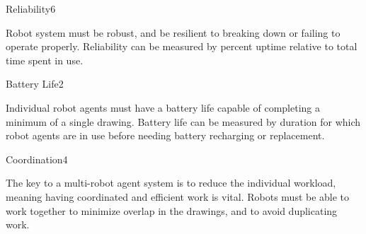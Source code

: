 \begin{nonfunctional_requirement}{Reliability}{6}
\item Robot system must be robust, and be resilient to breaking down or failing to operate properly. Reliability can be measured by percent uptime relative to total time spent in use.
\end{nonfunctional_requirement}

\begin{nonfunctional_requirement}{Battery Life}{2}
\item Individual robot agents must have a battery life capable of completing a minimum of a single drawing. Battery life can be measured by duration for which robot agents are in use before needing battery recharging or replacement.
\end{nonfunctional_requirement}

\begin{nonfunctional_requirement}{Coordination}{4}
\item The key to a multi-robot agent system is to reduce the individual workload, meaning having coordinated and efficient work is vital. Robots must be able to work together to minimize overlap in the drawings, and to avoid duplicating work.
\end{nonfunctional_requirement}

\begin{comment}
\end{comment}
